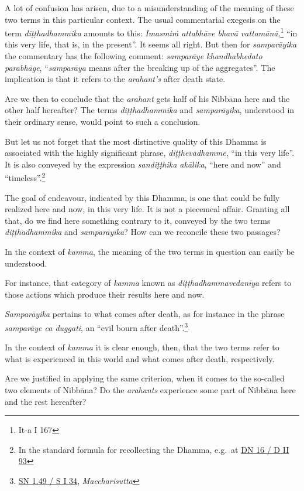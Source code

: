 A lot of confusion has arisen, due to a misunderstanding of the meaning of these two terms in this particular context. The usual commentarial exegesis on the term \emph{diṭṭhadhammika} amounts to this: \emph{Imasmiṁ attabhāve bhavā vattamānā},\footnote{It-a I 167} ``in this very life, that is, in the present''. It seems all right. But then for \emph{samparāyika} the commentary has the following comment: \emph{samparāye khandhabhedato parabhāge}, ``\emph{samparāya} means after the breaking up of the aggregates''. The implication is that it refers to the \emph{arahant's} after death state.

Are we then to conclude that the \emph{arahant} gets half of his Nibbāna here and the other half hereafter? The terms \emph{diṭṭhadhammika} and \emph{samparāyika}, understood in their ordinary sense, would point to such a conclusion.

But let us not forget that the most distinctive quality of this Dhamma is associated with the highly significant phrase, \emph{diṭṭhevadhamme}, ``in this very life''. It is also conveyed by the expression \emph{sandiṭṭhika akālika}, ``here and now'' and ``timeless''.\footnote{In the standard formula for recollecting the Dhamma, e.g.~at \href{https://suttacentral.net/dn16/pli/ms}{DN 16 / D II 93}}

The goal of endeavour, indicated by this Dhamma, is one that could be fully realized here and now, in this very life. It is not a piecemeal affair. Granting all that, do we find here something contrary to it, conveyed by the two terms \emph{diṭṭhadhammika} and \emph{samparāyika}? How can we reconcile these two passages?

In the context of \emph{kamma}, the meaning of the two terms in question can easily be understood.

For instance, that category of \emph{kamma} known as \emph{diṭṭhadhammavedanīya} refers to those actions which produce their results here and now.

\emph{Samparāyika} pertains to what comes after death, as for instance in the phrase \emph{samparāye ca duggati}, an ``evil bourn after death''.\footnote{\href{https://suttacentral.net/sn1.49/pli/ms}{SN 1.49 / S I 34}, \emph{Maccharisutta}}

In the context of \emph{kamma} it is clear enough, then, that the two terms refer to what is experienced in this world and what comes after death, respectively.

Are we justified in applying the same criterion, when it comes to the so-called two elements of Nibbāna? Do the \emph{arahants} experience some part of Nibbāna here and the rest hereafter?

